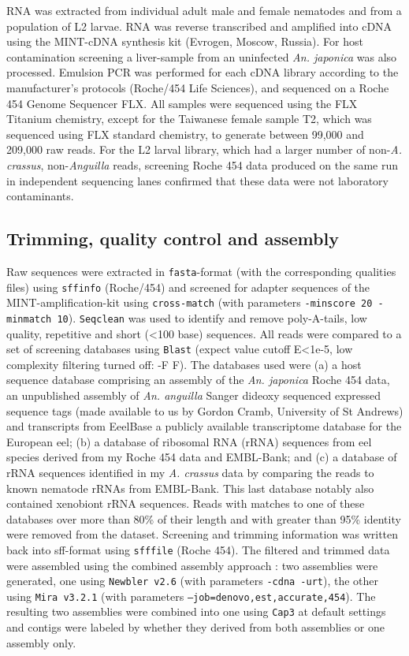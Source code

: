 RNA was extracted from individual adult male and female nematodes and
from a population of L2 larvae. RNA was reverse transcribed and
amplified into cDNA using the MINT-cDNA synthesis kit (Evrogen,
Moscow, Russia).  For host contamination screening a liver-sample from
an uninfected \textit{An. japonica} was also processed. Emulsion PCR
was performed for each cDNA library according to the manufacturer's
protocols (Roche/454 Life Sciences), and sequenced on a Roche 454
Genome Sequencer FLX. All samples were sequenced using the FLX
Titanium chemistry, except for the Taiwanese female sample T2, which
was sequenced using FLX standard chemistry, to generate between 99,000
and 209,000 raw reads. For the L2 larval library, which had a larger
number of non-\textit{A. crassus}, non-\textit{Anguilla} reads,
screening Roche 454 data produced on the same run in independent
sequencing lanes confirmed that these data were not laboratory
contaminants.

\subsection{Trimming, quality control and assembly}

Raw sequences were extracted in \texttt{fasta}-format (with the
corresponding qualities files) using \texttt{sffinfo} (Roche/454) and
screened for adapter sequences of the MINT-amplification-kit using
\texttt{cross-match} \cite{PHRAP} (with parameters \texttt{-minscore
  20 -minmatch 10}). \texttt{Seqclean} \cite{tgicl_pertea} was used to
identify and remove poly-A-tails, low quality, repetitive and short
(<100 base) sequences. All reads were compared to a set of screening
databases using \texttt{Blast} (expect value cutoff E<1e-5, low
complexity filtering turned off: -F F). The databases used were (a) a
host sequence database comprising an assembly of the
\textit{An. japonica} Roche 454 data, an unpublished assembly of
\textit{An. anguilla} Sanger dideoxy sequenced expressed sequence tags
(made available to us by Gordon Cramb, University of St Andrews) and
transcripts from EeelBase \cite{pmid21080939} a publicly available
transcriptome database for the European eel; (b) a database of
ribosomal RNA (rRNA) sequences from eel species derived from my Roche
454 data and EMBL-Bank; and (c) a database of rRNA sequences
identified in my \textit{A. crassus} data by comparing the reads to
known nematode rRNAs from EMBL-Bank. This last database notably also
contained xenobiont rRNA sequences. Reads with matches to one of these
databases over more than 80\% of their length and with greater than
95\% identity were removed from the dataset. Screening and trimming
information was written back into sff-format using \texttt{sfffile}
(Roche 454). The filtered and trimmed data were assembled using the
combined assembly approach \cite{pmid20950480}: two assemblies were
generated, one using \texttt{Newbler v2.6} \cite{pmid16056220} (with
parameters \texttt{-cdna -urt}), the other using \texttt{Mira v3.2.1}
\cite{miraEST} (with parameters
\texttt{--job=denovo,est,accurate,454}). The resulting two assemblies
were combined into one using \texttt{Cap3} \cite{Cap3_Huang} at
default settings and contigs were labeled by whether they derived from
both assemblies or one assembly only.

